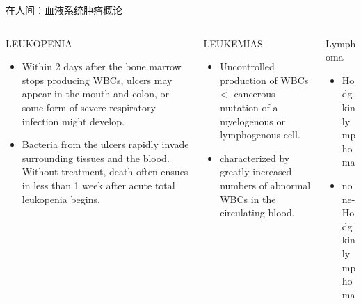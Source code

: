 \documentclass[
  ignorenonframetext,
]{beamer}
\begin{document}
\begin{frame}{在人间：血液系统肿瘤概论}
\protect\hypertarget{ux5728ux4ebaux95f4ux8840ux6db2ux7cfbux7edfux80bfux7624ux6982ux8bba}{}
\begin{columns}[T]
\begin{column}{0.3\textwidth}
\begin{block}{LEUKOPENIA}
\protect\hypertarget{leukopenia}{}
\begin{itemize}
\item
  Within 2 days after the bone marrow stops producing WBCs, ulcers may
  appear in the mouth and colon, or some form of severe respiratory
  infection might develop.
\item
  Bacteria from the ulcers rapidly invade surrounding tissues and the
  blood. Without treatment, death often ensues in less than 1 week after
  acute total leukopenia begins.
\end{itemize}
\end{block}
\end{column}

\begin{column}{0.3\textwidth}
\begin{block}{LEUKEMIAS}
\protect\hypertarget{leukemias}{}
\begin{itemize}
\item
  Uncontrolled production of WBCs \textless- cancerous mutation of a
  myelogenous or lymphogenous cell.
\item
  characterized by greatly increased numbers of abnormal WBCs in the
  circulating blood.
\end{itemize}
\end{block}
\end{column}

\begin{column}{0.3\textwidth}
\begin{block}{Lymphoma}
\protect\hypertarget{lymphoma}{}
\begin{itemize}
\item
  Hodgkin lymphoma
\item
  none-Hodgkin lymphoma
\end{itemize}
\end{block}
\end{column}
\end{columns}
\end{frame}
\end{document}
